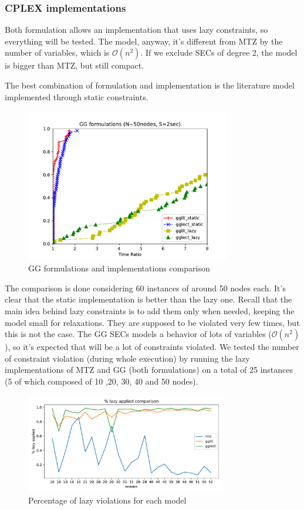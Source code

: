 \subsubsection{CPLEX implementations}
Both formulation allows an implementation that uses lazy constraints, so
everything will be tested. The model, anyway, it's different from MTZ by the
number of variables, which is $\mathcal{O}(n^2)$. If we exclude
SECs of degree 2, the model is bigger than MTZ, but still compact.

\begin{claim} 
    The best combination of formulation and implementation is the literature
    model implemented through static constraints. 
\end{claim}

\begin{figure}[h]
    \centering
    \includegraphics[width=0.8\textwidth]{figures/gg_comp1}
    \caption{GG formulations and implementations comparison}
\end{figure}

The comparison is done considering 60 instances of around 50 nodes each. It's
clear that the static implementation is better than the lazy one. Recall that
the main idea behind lazy constraints is to add them only when needed, keeping
the model small for relaxations. They are supposed to be violated very few
times, but this is not the case. The GG SECs models a behavior of lots of
variables ($\mathcal{O}(n^2)$), so it's expected that will be a lot of
constraints violated. We tested the number of constraint violation (during whole
execution) by running the lazy implementations of MTZ and GG (both formulations)
on a total of 25 instances (5 of which composed of 10 ,20, 30, 40 and 50
nodes).

\begin{figure}[h]
    \centering
    \includegraphics[width=0.78\textwidth]{figures/perc_lazy}
    \caption{Percentage of lazy violations for each model}
\end{figure}

